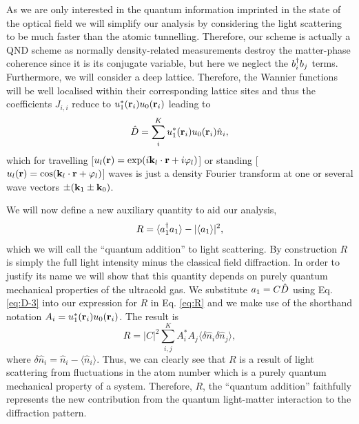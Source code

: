 As we are only interested in the quantum information imprinted in the
state of the optical field we will simplify our analysis by
considering the light scattering to be much faster than the atomic
tunnelling. Therefore, our scheme is actually a QND scheme
\cite{mekhov2007prl, mekhov2007pra, rogers2014, eckert2008} as
normally density-related measurements destroy the matter-phase
coherence since it is its conjugate variable, but here we neglect the
$b^\dagger_i b_j$ terms. Furthermore, we will consider a deep
lattice. Therefore, the Wannier functions will be well localised
within their corresponding lattice sites and thus the coefficients
$J_{i,i}$ reduce to $u_1^*(\mathbf{r}_i) u_0(\mathbf{r}_i)$ leading to
\begin{equation}
  \label{eq:D-3}
  \hat{D}=\sum_i^K u_1^*(\mathbf{r}_i) u_0(\mathbf{r}_i) \hat{n}_i,
\end{equation} 
which for travelling
[$u_l(\mathbf{r})=\exp(i \mathbf{k}_l \cdot \mathbf{r}+i\varphi_l)$] or standing
[$u_l(\mathbf{r})=\cos(\mathbf{k}_l \cdot \mathbf{r}+\varphi_l)$] waves is just a
density Fourier transform at one or several wave vectors
$\pm(\mathbf{k}_1 \pm \mathbf{k}_0)$. 

We will now define a new auxiliary quantity to aid our analysis,
\begin{equation}
  \label{eq:R}
  R = \langle a^\dagger_1 a_1 \rangle - | \langle a_1 \rangle |^2,
\end{equation}
which we will call the ``quantum addition'' to light scattering. By
construction $R$ is simply the full light intensity minus the
classical field diffraction. In order to justify its name we will show
that this quantity depends on purely quantum mechanical properties of the
ultracold gas. We substitute $a_1 = C \hat{D}$ using
Eq. \eqref{eq:D-3} into our expression for $R$ in Eq. \eqref{eq:R} and
we make use of the shorthand notation
$A_i = u_1^*(\mathbf{r}_i) u_0(\mathbf{r}_i)$. The result is
\begin{equation}
  \label{eq:Rfluc}
  R = |C|^2 \sum_{i,j}^K A^*_i A_j \langle \delta \hat{n}_i \delta
  \hat{n}_j \rangle,
\end{equation}
where $\delta \hat{n}_i = \hat{n}_i - \langle \hat{n}_i
\rangle$. Thus, we can clearly see that $R$ is a result of light
scattering from fluctuations in the atom number which is a purely
quantum mechanical property of a system. Therefore, $R$, the ``quantum
addition'' faithfully represents the new contribution from the quantum
light-matter interaction to the diffraction pattern.

